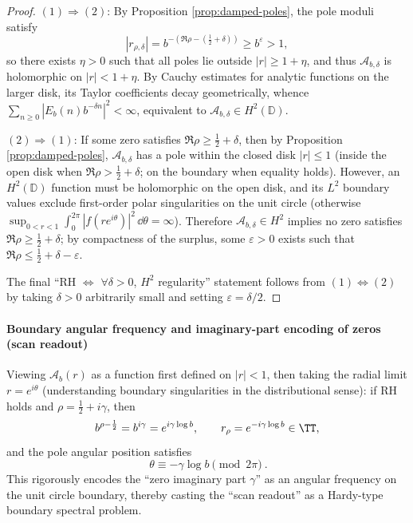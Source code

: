 \begin{proof}
\((1)\Rightarrow(2)\): By Proposition \ref{prop:damped-poles}, the pole moduli satisfy
\[
|r_{\rho,\delta}|=b^{-(\Re\rho-(\frac12+\delta))}\ge b^{\varepsilon}>1,
\]
so there exists \(\eta>0\) such that all poles lie outside \(|r|\ge 1+\eta\), and thus \(\mathcal A_{b,\delta}\) is holomorphic on \(|r|<1+\eta\). By Cauchy estimates for analytic functions on the larger disk, its Taylor coefficients decay geometrically, whence \(\sum_{n\ge 0}|E_b(n)b^{-\delta n}|^2<\infty\), equivalent to \(\mathcal A_{b,\delta}\in H^2(\mathbb D)\).

\((2)\Rightarrow(1)\): If some zero satisfies \(\Re\rho\ge \tfrac12+\delta\), then by Proposition \ref{prop:damped-poles}, \(\mathcal A_{b,\delta}\) has a pole within the closed disk \(|r|\le 1\) (inside the open disk when \(\Re\rho>\tfrac12+\delta\); on the boundary when equality holds). However, an \(H^2(\mathbb D)\) function must be holomorphic on the open disk, and its \(L^2\) boundary values exclude first-order polar singularities on the unit circle (otherwise \(\sup_{0<r<1}\int_0^{2\pi}|f(re^{i\theta})|^2\,\dd\theta=\infty\)). Therefore \(\mathcal A_{b,\delta}\in H^2\) implies no zero satisfies \(\Re\rho\ge \tfrac12+\delta\); by compactness of the surplus, some \(\varepsilon>0\) exists such that \(\Re\rho\le\tfrac12+\delta-\varepsilon\).

The final ``RH \(\Leftrightarrow\) \(\forall\delta>0\), \(H^2\) regularity'' statement follows from \((1)\Leftrightarrow(2)\) by taking \(\delta>0\) arbitrarily small and setting \(\varepsilon=\delta/2\).
\end{proof}

\paragraph{Boundary angular frequency and imaginary-part encoding of zeros (scan readout)}
Viewing \(\mathcal A_b(r)\) as a function first defined on \(|r|<1\), then taking the radial limit \(r=e^{i\theta}\) (understanding boundary singularities in the distributional sense): if RH holds and \(\rho=\tfrac12+i\gamma\), then
\[
b^{\rho-\frac12}=b^{i\gamma}=e^{i\gamma\log b},
\qquad
r_\rho=e^{-i\gamma\log b}\in\TT,
\]
and the pole angular position satisfies
\[
\boxed{\ \theta\equiv -\gamma\log b\pmod{2\pi}\ }.
\]
This rigorously encodes the ``zero imaginary part \(\gamma\)'' as an angular frequency on the unit circle boundary, thereby casting the ``scan readout'' as a Hardy-type boundary spectral problem.

